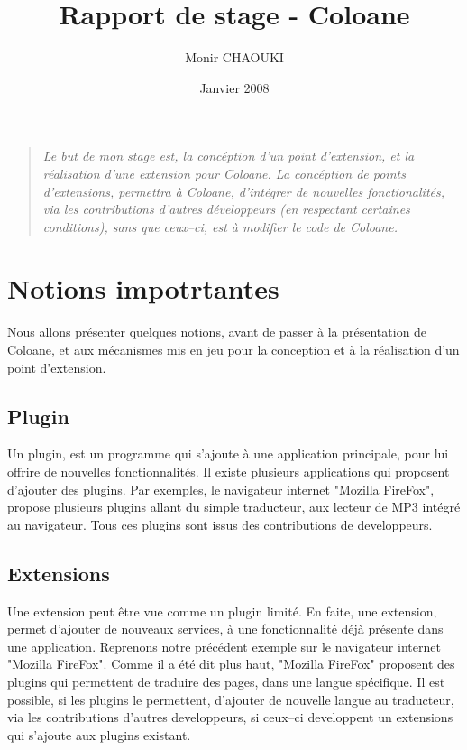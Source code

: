 \documentclass{article}
\title{Rapport de stage - Coloane}
\date{Janvier 2008}
\author{Monir CHAOUKI}
\begin{document}
\maketitle

\begin{quotation}
\textit{
Le but de mon stage est, la concéption d'un point d'extension, et la réalisation 
d'une extension pour Coloane. La concéption de points d'extensions, permettra à 
Coloane, d'intégrer de nouvelles fonctionalités, via les contributions 
d'autres développeurs (en respectant certaines conditions), sans que ceux--ci,
 est à modifier le code de Coloane.}
\end{quotation}

\newpage

\section{Notions impotrtantes}
Nous allons présenter quelques notions, avant de passer à la présentation de 
Coloane, et aux mécanismes mis en jeu pour la conception et à la réalisation 
d'un point d'extension.

\subsection{Plugin}
Un plugin, est un programme qui s'ajoute à une application principale, pour lui 
offrire de nouvelles fonctionnalités. Il existe plusieurs applications qui 
proposent d'ajouter des plugins. Par exemples, le navigateur internet 
"Mozilla FireFox", propose plusieurs plugins allant du simple traducteur, aux 
lecteur de MP3 intégré au navigateur. Tous ces plugins sont issus des 
contributions de developpeurs.

\subsection{Extensions}
Une extension peut être vue comme un plugin limité. En faite, une extension, 
permet d'ajouter de nouveaux services, à une fonctionnalité déjà présente dans 
une application. Reprenons notre précédent exemple sur le navigateur internet 
"Mozilla FireFox". Comme il a été dit plus haut, "Mozilla FireFox" proposent 
des plugins qui permettent de traduire des pages, dans une langue spécifique. 
Il est possible, si les plugins le permettent, d'ajouter de nouvelle langue au 
traducteur, via les contributions d'autres developpeurs, si ceux--ci developpent 
un extensions qui s'ajoute aux plugins existant.
\end{document}
